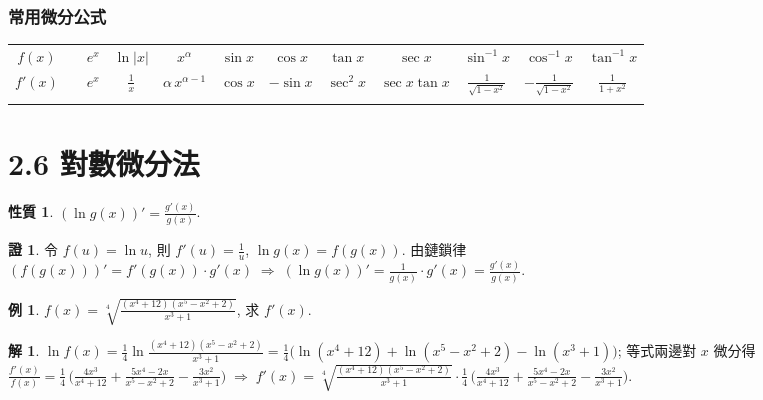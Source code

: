 \documentclass[12pt]{extarticle}
\newcommand{\ds}{\displaystyle}
\newcommand{\ie}{\;\Longrightarrow\;}
\theoremstyle{definition}
\newtheorem*{prp}{性質}
\newtheorem*{ex}{例}
\newtheorem*{sol}{解}
\newtheorem*{prf}{證}
\begin{document}
\subsubsection*{常用微分公式}

\begin{table}[!htbp]
  \centering
  \begin{tabular}{c|ccccccccccc}
    \toprule
    \addlinespace[2mm]
    $\ds f(x)$ & & $\ds e^x$ & $\ds\ln |x|$ & $\ds x^\alpha$ & $\ds\sin x$ & $\ds\cos x$ & $\ds\tan x$ & $\ds\sec x$ & $\ds\sin^{-1}\!x$ & $\ds\cos^{-1}\!x$ & $\ds\tan^{-1}\!x$ \\
    \addlinespace[2mm]
    \midrule
    \addlinespace[2mm]
    $\ds f'(x)$ & & $\ds e^x$ & $\ds\frac{1}{x}$ & $\ds \alpha\,x^{\alpha - 1}$ & $\ds\cos x$ & $\ds-\sin x$ & $\ds\sec^2\!x$ & $\ds\sec x\tan x$ & $\ds\frac{1}{\sqrt{1 - x^2}}$ & $\ds -\frac{1}{\sqrt{1 - x^2}}$ & $\ds\frac{1}{1 + x^2}$ \\
    \addlinespace[2mm]
    \bottomrule
  \end{tabular}
\end{table}

\section*{2.6 對數微分法}

\begin{prp}
  $\ds(\ln g(x))' = \frac{g'(x)}{g(x)}$.  
\end{prp}

\begin{prf}
  令 $\ds f(u) = \ln u$, 則 $\ds f'(u) = \frac{1}{u}$, $\ds\ln g(x) = f(g(x))$. 由鏈鎖律 $\ds(f(g(x)))' = f'(g(x))\cdot g'(x) \ie (\ln g(x))' = \frac{1}{g(x)}\cdot g'(x) = \frac{g'(x)}{g(x)}$. 
\end{prf}

\begin{ex}
  $\ds f(x) = \sqrt[4]{\frac{(x^4 + 12)(x^5 - x^2 + 2)}{x^3 + 1}}$, 求 $f'(x)$. 
\end{ex}

\begin{sol}
  $\ds\ln f(x) = \frac{1}{4}\ln\frac{(x^4 + 12)(x^5 - x^2 + 2)}{x^3 + 1} = \frac{1}{4}\big(\ln(x^4 + 12) + \ln(x^5 - x^2 + 2) - \ln(x^3 + 1)\big)$; 等式兩邊對 $x$ 微分得 $\ds\frac{f'(x)}{f(x)} = \frac{1}{4}\,\Big(\frac{4x^3}{x^4 + 12} + \frac{5x^4 - 2x}{x^5 - x^2 + 2} - \frac{3x^2}{x^3 + 1}\Big) \ie f'(x) = \sqrt[4]{\frac{(x^4 + 12)(x^5 - x^2 + 2)}{x^3 + 1}}\cdot\frac{1}{4}\,\Big(\frac{4x^3}{x^4 + 12} + \frac{5x^4 - 2x}{x^5 - x^2 + 2} - \frac{3x^2}{x^3 + 1}\Big)$. 
\end{sol}
\end{document}
